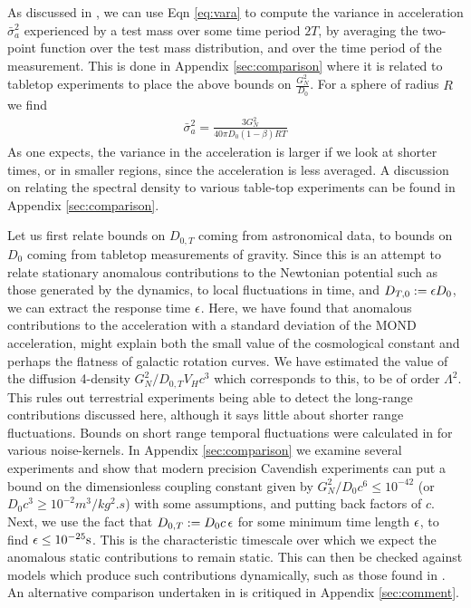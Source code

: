 \documentclass[aps,pra,amsmath,amssymb,amsthm,floatfix,nofootinbib,notitlepage,superscriptaddress,10pt]{revtex4-2}
\begin{document}
As discussed in \cite{oppenheim2023gravitationally}, we can use Eqn \eqref{eq:vara} to compute the variance in acceleration $\bar{\sigma}_a^2$ experienced by a test mass over some time period $2T$, by averaging the two-point function over the test mass distribution, and over the time period of the measurement. This is done in Appendix \ref{sec:comparison} where it is  related to tabletop experiments to place the above bounds on $\frac{G_N^2}{D_{0}}$. For a sphere of radius $R$ we find
\begin{align}
	\bar{\sigma}_a^2= \frac{3G_N^2}{40\pi D_{0}(1-\beta) RT}
	\label{eq:ShereSpec-main}
\end{align}
As one expects, the variance in the acceleration is larger if we look at shorter times, or in smaller regions, since the acceleration is less averaged.  
A discussion on relating the spectral density to various table-top experiments can be found in Appendix \ref{sec:comparison}. 




Let us first relate bounds on $D_{0,T}$ coming from astronomical data, to bounds on $D_0$ coming from tabletop measurements of gravity. Since this is an attempt to relate stationary anomalous contributions to the Newtonian potential such as those generated by the dynamics, to local fluctuations in time, and $D_{T,0}:=\epsilon D_0$, we can extract the response time $\epsilon$.
Here, we have found that anomalous contributions to the acceleration with a standard deviation of the MOND acceleration, might explain both the small value of the cosmological constant and perhaps the flatness of galactic rotation curves. We have estimated the value of the diffusion 4-density $G_N^2/D_{0,T} V_H c^3$ which corresponds to this, to be of order $\Lambda^2$. 
This rules out terrestrial experiments being able to detect the long-range contributions discussed here, although it says little about shorter range fluctuations. Bounds on short range temporal fluctuations were calculated in \cite{oppenheim2023gravitationally} for various noise-kernels. 
In Appendix \ref{sec:comparison} we examine several experiments and show that
modern precision Cavendish experiments can put a bound on the dimensionless coupling constant given by $G_N^2/D_0c^6\leq 10^{-42}$ (or $D_0c^3\geq 10^{-2} \unit{m^3/kg^2.s}$) with some assumptions, and putting back factors of $c$. Next, we use the fact that $D_{0,T}:=D_0 c\,\epsilon$ for some minimum time length $\epsilon$, to find $\eps\leq 10^{-25}\unit{s}$. This is the characteristic timescale over which we expect the anomalous static contributions to remain static. This can then be checked against models which produce such contributions dynamically, such as those found in \cite{UCLcosmo}.
An alternative comparison undertaken in \cite{hertzberg2024comment} is critiqued in Appendix \ref{sec:comment}.
\end{document}
